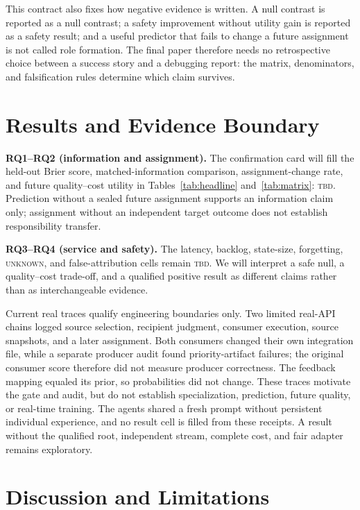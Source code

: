 \documentclass[sigconf,anonymous]{aamas}
\newcommand{\unknown}{\textsc{unknown}}
\begin{document}
This contract also fixes how negative evidence is written. A null contrast is reported as a null contrast; a safety improvement without utility gain is reported as a safety result; and a useful predictor that fails to change a future assignment is not called role formation. The final paper therefore needs no retrospective choice between a success story and a debugging report: the matrix, denominators, and falsification rules determine which claim survives.

\section{Results and Evidence Boundary}
\label{sec:current}

\textbf{RQ1--RQ2 (information and assignment).} The confirmation card will fill the held-out Brier score, matched-information comparison, assignment-change rate, and future quality--cost utility in Tables~\ref{tab:headline} and~\ref{tab:matrix}: \textsc{tbd}. Prediction without a sealed future assignment supports an information claim only; assignment without an independent target outcome does not establish responsibility transfer.

\textbf{RQ3--RQ4 (service and safety).} The latency, backlog, state-size, forgetting, \unknown{}, and false-attribution cells remain \textsc{tbd}. We will interpret a safe null, a quality--cost trade-off, and a qualified positive result as different claims rather than as interchangeable evidence.

Current real traces qualify engineering boundaries only. Two limited real-API chains logged source selection, recipient judgment, consumer execution, source snapshots, and a later assignment. Both consumers changed their own integration file, while a separate producer audit found priority-artifact failures; the original consumer score therefore did not measure producer correctness. The feedback mapping equaled its prior, so probabilities did not change. These traces motivate the gate and audit, but do not establish specialization, prediction, future quality, or real-time training. The agents shared a fresh prompt without persistent individual experience, and no result cell is filled from these receipts. A result without the qualified root, independent stream, complete cost, and fair adapter remains exploratory.

\section{Discussion and Limitations}
\end{document}
